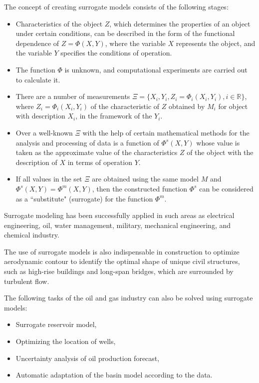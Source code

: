\documentclass[12pt]{report}
\theoremstyle{definition}
\providecommand{\tightlist}{%
	\setlength{\itemsep}{0pt}\setlength{\parskip}{0pt}}
\begin{document}
The concept of creating surrogate models consists of the following stages:

\begin{itemize}
	\tightlist
	\item  
	Characteristics of the object $Z$, which determines the properties of an object under certain conditions, can be described in the form of the functional dependence of $Z= \Phi \left( X, Y \right)$, where the variable $X$ represents the object, and the variable $Y$ specifies the conditions of operation.
	\item
	The function $\Phi$ is unknown, and computational experiments are carried out to calculate it.
	\item
	There are a number of measurements $ \Xi = \{ X_i,Y_i,Z_i= \Phi_i \left( X_i,Y_i \right), i \in \mathbb{R} \} $, where $Z_i= \Phi_i \left( X_i, Y_i \right) $ of the characteristic of $Z$ obtained by $M_i$ for object with description $X_i$, in the framework of the $Y_i$.
	\item
	Over a well-known $\Xi$ with the help of certain mathematical methods for the analysis and processing of data is a function of $\Phi^s \left( X,Y \right)$ whose value is taken as the approximate value of the characteristics $Z$ of the object with the description of $X$ in terms of operation $Y$.
	\item
	If all values in the set $\Xi$ are obtained using the same model $M$ and $\Phi^s (X,Y) = \Phi^m \left( X,Y \right)$, then the constructed function $\Phi^s$ can be considered as a ``substitute" (surrogate) for the function $\Phi^m$.
\end{itemize}

Surrogate modeling has been successfully applied in such areas as electrical engineering, oil, water management, military, mechanical engineering, and chemical industry.

The use of surrogate models is also indispensable in construction to optimize aerodynamic contour to identify the optimal shape of unique civil structures, such as high-rise buildings and long-span bridges, which are surrounded by turbulent flow.

The following tasks of the oil and gas industry can also be solved using surrogate models:
\begin{itemize}
	\tightlist
	\item Surrogate reservoir model,
	\item Optimizing the location of wells,
	\item Uncertainty analysis of oil production forecast,
	\item Automatic adaptation of the basin model according to the data.
\end{itemize}
\end{document}
